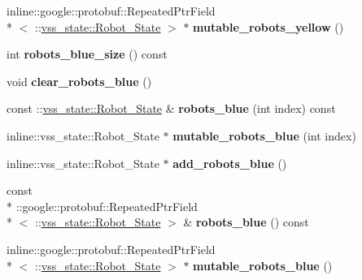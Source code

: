 \begin{DoxyCompactItemize}
\item 
\hypertarget{classvss__state_1_1Global__State_a533514002331b04a673326f334a3e5ce}{inline\-::google\-::protobuf\-::\-Repeated\-Ptr\-Field\\*
$<$ \-::\hyperlink{classvss__state_1_1Robot__State}{vss\-\_\-state\-::\-Robot\-\_\-\-State} $>$ $\ast$ {\bfseries mutable\-\_\-robots\-\_\-yellow} ()}\label{classvss__state_1_1Global__State_a533514002331b04a673326f334a3e5ce}

\item 
\hypertarget{classvss__state_1_1Global__State_ab19e999740e3aa72946a92322bc7f163}{int {\bfseries robots\-\_\-blue\-\_\-size} () const }\label{classvss__state_1_1Global__State_ab19e999740e3aa72946a92322bc7f163}

\item 
\hypertarget{classvss__state_1_1Global__State_ae88bcfb62ea5ea68673a48aaec873723}{void {\bfseries clear\-\_\-robots\-\_\-blue} ()}\label{classvss__state_1_1Global__State_ae88bcfb62ea5ea68673a48aaec873723}

\item 
\hypertarget{classvss__state_1_1Global__State_a92551a5a96b8585f89cc37c55b0c4e46}{const \-::\hyperlink{classvss__state_1_1Robot__State}{vss\-\_\-state\-::\-Robot\-\_\-\-State} \& {\bfseries robots\-\_\-blue} (int index) const }\label{classvss__state_1_1Global__State_a92551a5a96b8585f89cc37c55b0c4e46}

\item 
\hypertarget{classvss__state_1_1Global__State_a1caf337906ddf4fa47b606dc76cd8a3b}{inline\-::vss\-\_\-state\-::\-Robot\-\_\-\-State $\ast$ {\bfseries mutable\-\_\-robots\-\_\-blue} (int index)}\label{classvss__state_1_1Global__State_a1caf337906ddf4fa47b606dc76cd8a3b}

\item 
\hypertarget{classvss__state_1_1Global__State_a3150ca6510afc0a88b10491642dff24a}{inline\-::vss\-\_\-state\-::\-Robot\-\_\-\-State $\ast$ {\bfseries add\-\_\-robots\-\_\-blue} ()}\label{classvss__state_1_1Global__State_a3150ca6510afc0a88b10491642dff24a}

\item 
\hypertarget{classvss__state_1_1Global__State_ad659e30adf37a0e412765337eb28f233}{const \\*
\-::google\-::protobuf\-::\-Repeated\-Ptr\-Field\\*
$<$ \-::\hyperlink{classvss__state_1_1Robot__State}{vss\-\_\-state\-::\-Robot\-\_\-\-State} $>$ \& {\bfseries robots\-\_\-blue} () const }\label{classvss__state_1_1Global__State_ad659e30adf37a0e412765337eb28f233}

\item 
\hypertarget{classvss__state_1_1Global__State_a73be200ff11edfc042221b579672d3b4}{inline\-::google\-::protobuf\-::\-Repeated\-Ptr\-Field\\*
$<$ \-::\hyperlink{classvss__state_1_1Robot__State}{vss\-\_\-state\-::\-Robot\-\_\-\-State} $>$ $\ast$ {\bfseries mutable\-\_\-robots\-\_\-blue} ()}\label{classvss__state_1_1Global__State_a73be200ff11edfc042221b579672d3b4}

\end{DoxyCompactItemize}
